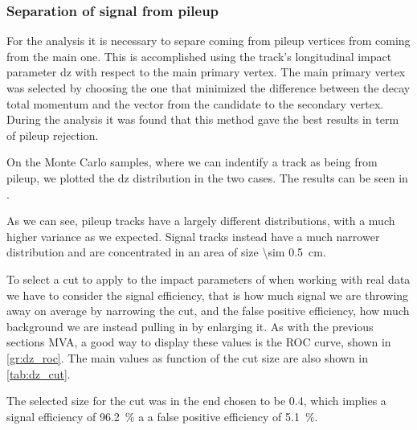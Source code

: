 \subsubsection{Separation of signal from pileup \Pgm}
\label{subsubsec:pil_rej}

For the analysis it is necessary to separe \Pgm coming from pileup vertices from \Pgm coming from the main one.
This is accomplished using the \Pgm track's longitudinal impact parameter dz with respect to the main primary vertex.
The main primary vertex was selected by choosing the one that minimized the difference between the decay total momentum and the vector from the candidate to the secondary vertex.
During the analysis it was found that this method gave the best results in term of pileup rejection.

On the Monte Carlo samples, where we can indentify a track as being from pileup, we plotted the dz distribution in the two cases. 
The results can be seen in .


As we can see, pileup tracks have a largely different distributions, with a much higher variance as we expected.
Signal tracks instead have a much narrower distribution and are concentrated in an area of size \SI{\sim 0.5}{\cm}.

To select a cut to apply to the impact parameters of \Pgm when working with real data we have to consider the signal efficiency, that is how much signal we are throwing away on average by narrowing the cut, and the false positive efficiency, how much background we are instead pulling in by enlarging it.
As with the previous sections MVA, a good way to display these values is the ROC curve, shown in \autoref{gr:dz_roc}.
The main values as function of the cut size are also shown in \autoref{tab:dz_cut}.



The selected size for the cut was in the end chosen to be 0.4, which implies a signal efficiency of \SI{96.2}{\percent} a a false positive efficiency of \SI{5.1}{\percent}.
